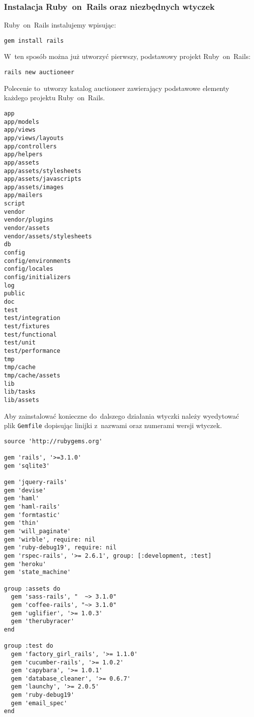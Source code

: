 \subsubsection{Instalacja Ruby~on~Rails oraz niezbędnych wtyczek}

Ruby~on~Rails instalujemy wpisując:


\texttt{gem install rails}


W~ten sposób można już utworzyć pierwszy, podstawowy projekt Ruby~on~Rails:


\texttt{rails new auctioneer}


Polecenie to~utworzy katalog auctioneer zawierający podstawowe elementy każdego projektu Ruby~on~Rails.

 \label{code.railsdir}
\begin{lstlisting}
app
app/models
app/views
app/views/layouts
app/controllers
app/helpers
app/assets
app/assets/stylesheets
app/assets/javascripts
app/assets/images
app/mailers
script
vendor
vendor/plugins
vendor/assets
vendor/assets/stylesheets
db
config
config/environments
config/locales
config/initializers
log
public
doc
test
test/integration
test/fixtures
test/functional
test/unit
test/performance
tmp
tmp/cache
tmp/cache/assets
lib
lib/tasks
lib/assets
\end{lstlisting}

Aby zainstalować konieczne do~dalszego działania wtyczki należy wyedytować plik \texttt{Gemfile} dopisując linijki z~nazwami oraz numerami wersji wtyczek.

 \label{code.railsdir}
\begin{lstlisting}
source 'http://rubygems.org'

gem 'rails', '>=3.1.0'
gem 'sqlite3'

gem 'jquery-rails'
gem 'devise'
gem 'haml'
gem 'haml-rails'
gem 'formtastic'
gem 'thin'
gem 'will_paginate'
gem 'wirble', require: nil
gem 'ruby-debug19', require: nil
gem 'rspec-rails', '>= 2.6.1', group: [:development, :test]
gem 'heroku'
gem 'state_machine'

group :assets do
  gem 'sass-rails', "  ~> 3.1.0"
  gem 'coffee-rails', "~> 3.1.0"
  gem 'uglifier', '>= 1.0.3'
  gem 'therubyracer'
end

group :test do
  gem 'factory_girl_rails', '>= 1.1.0'
  gem 'cucumber-rails', '>= 1.0.2'
  gem 'capybara', '>= 1.0.1'
  gem 'database_cleaner', '>= 0.6.7'
  gem 'launchy', '>= 2.0.5'
  gem 'ruby-debug19'
  gem 'email_spec'
end
\end{lstlisting}

